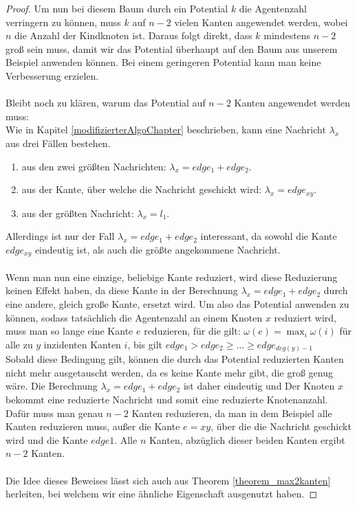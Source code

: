 \begin{proof}
	Um nun bei diesem Baum durch ein Potential $k$ die Agentenzahl verringern zu können, muss $k$ auf $n-2$ vielen Kanten angewendet werden, wobei $n$ die Anzahl der Kindknoten ist. Daraus folgt direkt, dass $k$ mindestens $n-2$ groß sein muss, damit wir das Potential überhaupt auf den Baum aus unserem Beispiel anwenden können. Bei einem geringeren Potential kann man keine Verbesserung erzielen.
	\\
	\\
	Bleibt noch zu klären, warum das Potential auf $n-2$ Kanten angewendet werden muss:
	\\
	Wie in Kapitel \ref{modifizierterAlgoChapter} beschrieben, kann eine Nachricht $\lambda_{x}$ aus drei Fällen bestehen. 
	\begin{enumerate}[label=\alph*)]
		\item aus den zwei größten Nachrichten: $\lambda_{x} = edge_{1} + edge_{2}$.
		\item aus der Kante, über welche die Nachricht geschickt wird: $\lambda_{x} = edge_{xy}$.
		\item aus der größten Nachricht: $\lambda_{x} = l_{1}$.
	\end{enumerate}	
	Allerdings ist nur der Fall $\lambda_{x} = edge_{1} + edge_{2}$ interessant, da sowohl die Kante $edge_{xy}$ eindeutig ist, als auch die größte angekommene Nachricht.
	\\
	\\
	Wenn man nun eine einzige, beliebige Kante reduziert, wird diese Reduzierung keinen Effekt haben, da diese Kante in der Berechnung $\lambda_{x} = edge_{1} + edge_{2}$ durch eine andere, gleich große Kante, ersetzt wird. Um also das Potential anwenden zu können, sodass tatsächlich die Agentenzahl an einem Knoten $x$ reduziert wird, muss man so lange eine Kante $e$ reduzieren, für die gilt: $\omega(e) = \max_{i} \omega(i)$ für alle zu $y$ inzidenten Kanten $i$, bis gilt $edge_{1} > edge_{2} \geq \dots \geq edge_{deg(y)-1}$
	\\
	Sobald diese Bedingung gilt, können die durch das Potential reduzierten Kanten nicht mehr ausgetauscht werden, da es keine Kante mehr gibt, die groß genug wäre. Die Berechnung $\lambda_{x} = edge_{1} + edge_{2}$ ist daher eindeutig und Der Knoten $x$ bekommt eine reduzierte Nachricht und somit eine reduzierte Knotenanzahl.
	\\
	Dafür muss man genau $n-2$ Kanten reduzieren, da man in dem Beispiel alle Kanten reduzieren muss, außer die Kante $e = {xy}$, über die die Nachricht geschickt wird und die Kante $edge{1}$. Alle $n$ Kanten, abzüglich dieser beiden Kanten ergibt $n-2$ Kanten.
	\\
	\\
	Die Idee dieses Beweises lässt sich auch aus Theorem \ref{theorem_max2kanten} herleiten, bei welchem wir eine ähnliche Eigenschaft ausgenutzt haben.
	
\end{proof}


